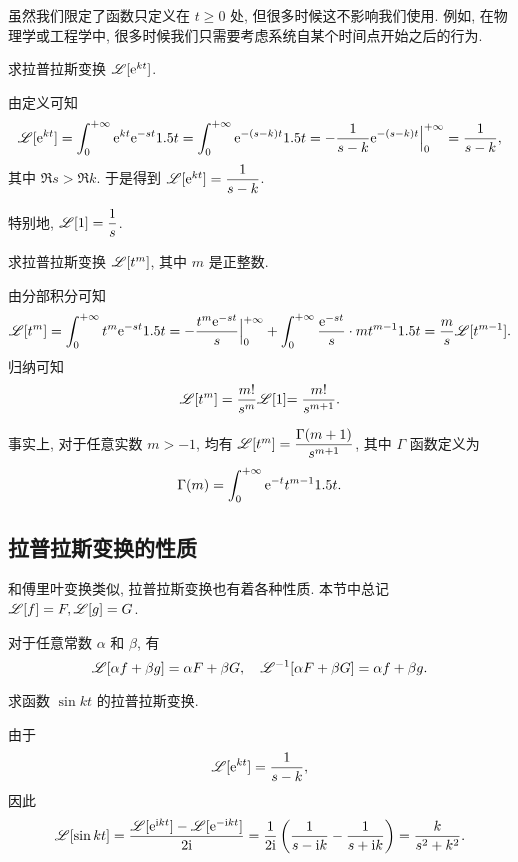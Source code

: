 虽然我们限定了函数只定义在 $t\ge 0$ 处, 但很多时候这不影响我们使用.
例如, 在物理学或工程学中, 很多时候我们只需要考虑系统自某个时间点开始之后的行为.

\begin{example}
  求拉普拉斯变换 $\mathscr{L}[\mathrm{e}^{kt}]$.
\end{example}

\begin{solution}
  由定义可知
  \[
     \mathscr{L}[\mathrm{e}^{kt}]
    =\displaystyle\int_0^{+\infty}\mathrm{e}^{kt}\mathrm{e}^{-st}1.5 t
    =\displaystyle\int_0^{+\infty}\mathrm{e}^{-(s-k)t}1.5 t
    =-\frac1{s-k}\mathrm{e}^{-(s-k)t}\Big|_0^{+\infty}
    =\frac1{s-k},
  \]
  其中 $\Re s>\Re k$.
  于是得到 $\mathscr{L}[\mathrm{e}^{kt}]=\dfrac1{s-k}$.
\end{solution}

特别地, $\mathscr{L}[1]=\dfrac1s$.

\begin{example}
  求拉普拉斯变换 $\mathscr{L}[t^m]$, 其中 $m$ 是正整数.
\end{example}

\begin{solution}
  由分部积分可知
  \[
     \mathscr{L}[t^m]
    =\displaystyle\int_0^{+\infty} t^m\mathrm{e}^{-st}1.5 t
    =-\frac{t^m\mathrm{e}^{-st}}s\Big|_0^{+\infty}+\displaystyle\int_0^{+\infty}\frac{\mathrm{e}^{-st}}s\cdot mt^{m-1}1.5 t
    =\frac ms\mathscr{L}[t^{m-1}].
  \]
  归纳可知
  \[
    \mathscr{L}[t^m]=\dfrac{m!}{s^m}\mathscr{L}[1]{=\dfrac{m!}{s^{m+1}}}.
  \]
\end{solution}

事实上, 对于任意实数 $m>-1$, 均有 $\mathscr{L}[t^m]=\dfrac{\Gamma(m+1)}{s^{m+1}}$, 其中 $\Gamma$ 函数定义为
\[
  \Gamma(m)=\displaystyle\int_0^{+\infty} \mathrm{e}^{-t}t^{m-1}1.5 t.
\]

\subsection{拉普拉斯变换的性质}

和傅里叶变换类似, 拉普拉斯变换也有着各种性质.
本节中总记 $\mathscr{L}[f]=F,\mathscr{L}[g]=G$.

\begin{theorem}[线性性质]
  对于任意常数 $\alpha$ 和 $\beta$, 有
  \[
    \mathscr{L}[\alpha f+\beta g]=\alpha F+\beta G,\quad
    \mathscr{L}^{-1}[\alpha F+\beta G]=\alpha f+\beta g.
  \]
\end{theorem}

\begin{example}
  求函数 $\sin{kt}$ 的拉普拉斯变换.
\end{example}

\begin{solution}
  由于
  \[
    \mathscr{L}[\mathrm{e}^{kt}]=\frac1{s-k},
  \]
  因此
  \[
     \mathscr{L}[\sin{kt}]
    =\frac{\mathscr{L}[\mathrm{e}^{\mathrm{i} kt}]-\mathscr{L}[\mathrm{e}^{-\mathrm{i} kt}]}{2\mathrm{i} }
    =\frac1{2\mathrm{i} }\left(\frac1{s-\mathrm{i} k}-\frac1{s+\mathrm{i} k}\right)
    =\frac k{s^2+k^2}.
  \]
\end{solution}

